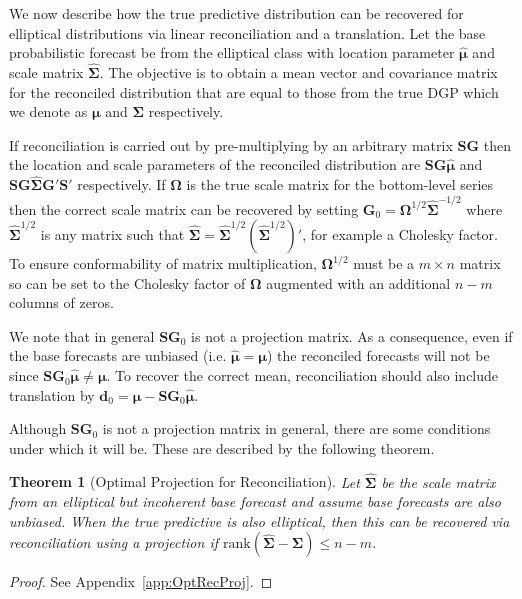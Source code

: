 \documentclass[12pt]{article}
\newtheorem{theo}{Theorem}[section]
\theoremstyle{definition}
\begin{document}
We now describe how the true predictive distribution can be recovered for elliptical distributions via linear reconciliation and a translation.  Let the base probabilistic forecast be from the elliptical class with location parameter $\hat{\bm{\mu}}$ and scale matrix $\hat{\bm{\Sigma}}$. The objective is to obtain a mean vector and covariance matrix for the reconciled distribution that are equal to those from the true DGP which we denote as $\bm{\mu}$ and $\bm{\Sigma}$ respectively.

If reconciliation is carried out by pre-multiplying by an arbitrary matrix $\bm{S}\bm{G}$ then the location and scale parameters of the reconciled distribution are $\bm{S}\bm{G}\hat{\bm{\mu}}$ and $\bm{S}\bm{G}\hat{\bm{\Sigma}}{\bm{G}}'\bm{S}'$ respectively.  If ${\bm\Omega}$ is the true scale matrix for the bottom-level series then the correct scale matrix can be recovered by setting ${\bm G}_0={\bm{\Omega}}^{1/2}\hat{\bm \Sigma}^{-1/2}$ where $\hat{\bm \Sigma}^{1/2}$ is any matrix such that $\hat{\bm \Sigma}=\hat{\bm \Sigma}^{1/2}(\hat{\bm \Sigma}^{1/2})'$, for example a Cholesky factor. To ensure conformability of matrix multiplication, ${\bm{\Omega}}^{1/2}$ must be a $m\times n$ matrix so can be set to the Cholesky factor of ${\bm{\Omega}}$ augmented with an additional $n-m$ columns of zeros.

We note that in general ${\bm S}{\bm G}_0$ is not a projection matrix.  As a consequence, even if the base forecasts are unbiased (i.e. $\hat{\bm{\mu}}=\bm{\mu}$) the reconciled forecasts will not be since ${\bm S}{\bm G}_{0}\hat{\bm{\mu}}\neq\bm{\mu}$.  To recover the correct mean, reconciliation should also include translation by ${\bm d}_{0}={\bm\mu}-{\bm S}{\bm G}_{0}\hat{\bm{\mu}}$.

Although ${\bm S}{\bm G}_0$ is not a projection matrix in general, there are some conditions under which it will be.  These are described by the following theorem.
\begin{theo}[Optimal Projection for Reconciliation]\label{theo:OptRecProj}
	Let $\hat{\bm{\Sigma}}$ be the scale matrix from an elliptical but incoherent base forecast and assume base forecasts are also unbiased.  When the true predictive is also elliptical, then this can be recovered via reconciliation using a projection if $\textrm{rank}(\hat{\bm{\Sigma}}-\bm{\Sigma})\leq n-m$.
\end{theo}
\begin{proof}
	See Appendix~\ref{app:OptRecProj}.
\end{proof}
\end{document}
